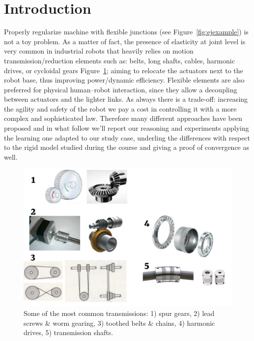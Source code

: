 \section*{Introduction}
Properly regularize machine with flexible junctions (see \small{Figure~\ref{fig:ejexample}}) is not a toy problem. As a matter of fact, the presence of elasticity at joint level is very common in industrial robots that heavily relies on motion transmission/reduction elements such as: belts, long shafts, cables, harmonic drives, or cycloidal gears Figure~\ref{fel}; aiming to relocate the actuators next to the robot base, thus improving power/dynamic efficiency. Flexible elements are also preferred for physical human–robot interaction, since they allow a decoupling between actuators and the lighter links. As always there is a trade-off: increasing the agility and safety of the robot we pay a cost in controlling it with a more complex and sophisticated law. Therefore many different approaches have been proposed \cite{simplepd,deluca93,deluca96} and in what follow we'll report our reasoning and experiments applying the learning one \cite{deluca96} adapted to our study case, underling the differences with respect to the rigid model studied during the course and giving a proof of convergence as well.

\begin{figure}[h!]
\centerline{\includegraphics[scale=1]{figures/flexelements.png}}
\caption{\label{fel}
Some of the most common transmissions: 1) spur gears, 2) lead screws \& worm gearing, 3)
toothed belts \& chains, 4) harmonic drives, 5) transmission shafts.}
\end{figure}


